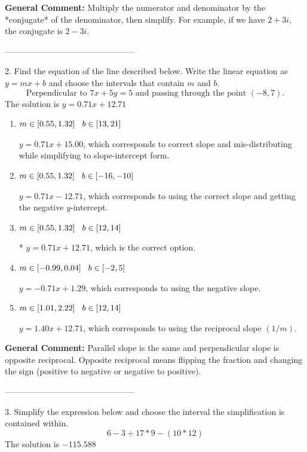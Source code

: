 \documentclass{extbook}[14pt]
\begin{document}
\textbf{General Comment:} Multiply the numerator and denominator by the *conjugate* of the denominator, then simplify. For example, if we have $2+3i$, the conjugate is $2-3i$. 

-----------------------------------------------

2. Find the equation of the line described below. Write the linear equation as $ y=mx+b $ and choose the intervals that contain $m$ and $b$.
\[ \text{Perpendicular to } 7 x + 5 y = 5 \text{ and passing through the point } (-8, 7). \] 
The solution is $ y = 0.71x + 12.71 $ 

\begin{enumerate}[label=\Alph*.] 
\item $ m \in [0.55, 1.32] \hspace*{3mm} b \in [13, 21] $ 

  $y = 0.71x + 15.00$, which corresponds to correct slope and mis-distributing while simplifying to slope-intercept form. 
\item $ m \in [0.55, 1.32] \hspace*{3mm} b \in [-16, -10] $ 

  $y = 0.71x - 12.71$, which corresponds to using the correct slope and getting the negative $y$-intercept. 
\item $ m \in [0.55, 1.32] \hspace*{3mm} b \in [12, 14] $ 

 * $y = 0.71x + 12.71$, which is the correct option. 
\item $ m \in [-0.99, 0.04] \hspace*{3mm} b \in [-2, 5] $ 

  $y = -0.71x + 1.29$, which corresponds to using the negative slope. 
\item $ m \in [1.01, 2.22] \hspace*{3mm} b \in [12, 14] $ 

  $y = 1.40x + 12.71$, which corresponds to using the reciprocal slope $(1/m)$. 
\end{enumerate} 
 
\textbf{General Comment:} Parallel slope is the same and perpendicular slope is opposite reciprocal. Opposite reciprocal means flipping the fraction and changing the sign (positive to negative or negative to positive). 

-----------------------------------------------

3. Simplify the expression below and choose the interval the simplification is contained within.
\[ 6 - 3 \div 17 * 9 - (10 * 12) \] 
The solution is $ -115.588 $ 
\end{document}
